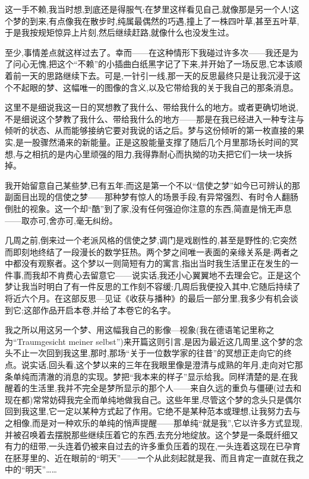 这一手不赖,我当时想,到底还是得服气:在梦里这样看见自己,就像那是另一个人!这个梦的到来,有点像我在散步时,纯属最偶然的巧遇,撞上了一株四叶草,甚至五叶草,于是我按规矩惊异上片刻,然后继续赶路,就像什么也没发生过。

至少,事情差点就这样过去了。幸而——在这种情形下我碰过许多次——我还是为了问心无愧,把这个“不赖”的小插曲白纸黑字记了下来,并开始了一场反思,它本该顺着前一天的思路继续下去。可是,一针引一线,那一天的反思最终只是让我沉浸于这个不起眼的梦、这幅唯一的图像的含义,以及它带给我的关于我自己的那条消息。

这里不是细说我这一日的冥想教了我什么、带给我什么的地方。或者更确切地说,不是细说这个梦教了我什么、带给我什么的地方——那是在我已经进入一种专注与倾听的状态、从而能够接纳它要对我说的话之后。梦与这份倾听的第一枚直接的果实,是一股骤然涌来的新能量。正是这股能量支撑了随后几个月里那场长时间的冥想,与之相抗的是内心里顽强的阻力,我得靠耐心而执拗的功夫把它们一块一块拆掉。

我开始留意自己某些梦,已有五年;而这是第一个不以“信使之梦”如今已可辨认的那副面目出现的信使之梦——那种梦有惊人的场景手段,有异常强烈、有时令人翻肠倒肚的视象。这一个却“酷”到了家,没有任何强迫你注意的东西,简直是悄无声息——取亦可,舍亦可,毫无纠纷。

 几周之前,倒来过一个老派风格的信使之梦,调门是戏剧性的,甚至是野性的;它突然而即刻地终结了一段漫长的数学狂热。两个梦之间唯一表面的亲缘关系是:两者之中都没有观察者。这个梦以一则简短有力的寓言,指出当时我生活里正在发生的一件事,而我却不肯费心去留意它——说实话,我还小心翼翼地不去理会它。正是这个梦让我当时明白了有一件反思的工作刻不容缓;几周后我便投入其中,它随后持续了将近六个月。在这部反思—见证《收获与播种》的最后一部分里,我多少有机会谈到它;这部作品开启本卷,并给了本卷它的名字。

 我之所以用这另一个梦、用这幅我自己的影像—视象(我在德语笔记里称之为“Traumgesicht meiner selbst”)来开篇这则引言,是因为最近这几周里,这个梦的念头不止一次回到我这里,那时,那场“关于一位数学家的往昔”的冥想正走向它的终点。说实话,回头看,这个梦以来的三年在我眼里像是澄清与成熟的年月,走向对它那条单纯而清澈的消息的实现。梦把“我本来的样子”显示给我。同样清楚的是,在我醒着的生活里,我并不完全是梦所显示的那个人——来自久远的重负与僵硬(过去和现在都)常常妨碍我完全而单纯地做我自己。这些年里,尽管这个梦的念头只是偶尔回到我这里,它一定以某种方式起了作用。它绝不是某种范本或理想,让我努力去与之相像,而是对一种欢乐的单纯的悄声提醒——那单纯“就是我”,它以许多方式显现,并被召唤着去摆脱那些继续压着它的东西,去充分地绽放。这个梦是一条既纤细又有力的纽带,一头连着仍被来自过去的许多重负压着的现在,一头连着这现在已孕育在胚芽里的、近在眼前的“明天”——一个从此刻起就是我、而且肯定一直就在我之中的“明天”……

